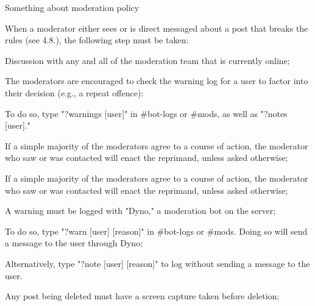 \begin{longenum}[ label*=\thesubsection.\arabic*., align=left]
\begin{longenum}[label*=\arabic*., align=left]
		\end{longenum}	
	\item Something about moderation policy
		\begin{longenum}[label*=\arabic*., align=left]	
		\item When a moderator either sees or is direct messaged about a post that breaks the rules (see 4.8.), the following step must be taken:
			\begin{longenum}[label*=\arabic*., align=left]	
			\item Discussion with any and all of the moderation team that is currently online;
				\begin{longenum}[label*=\arabic*., align=left]
				\item The moderators are encouraged to check the warning log for a user to factor into their decision (e.g., a repeat offence):
					\begin{longenum}[label*=\arabic*., align=left]
					\item To do so, type "?warnings [user]" in \#bot-logs or \#mods, as well as "?notes [user]."
					\end{longenum}	
				\end{longenum}	
			\item If a simple majority of the moderators agree to a course of action, the moderator who saw or was contacted will enact the reprimand, unless asked otherwise;
				\begin{longenum}[label*=\arabic*., align=left]
				\item If a simple majority of the moderators agree to a course of action, the moderator who saw or was contacted will enact the reprimand, unless asked otherwise;
				\end{longenum}	
			\item A warning must be logged with "Dyno," a moderation bot on the server;
				\begin{longenum}[label*=\arabic*., align=left]
				\item To do so, type "?warn [user] [reason]" in \#bot-logs or \#mods. Doing so will send a message to the user through Dyno;
				\end{longenum}	
				\begin{longenum}[label*=\arabic*., align=left]
				\item Alternatively, type "?note [user] [reason]" to log without sending a message to the user.
				\end{longenum}	
			\item Any post being deleted must have a screen capture taken before deletion;

\end{longenum}
\end{longenum}
\end{longenum}
